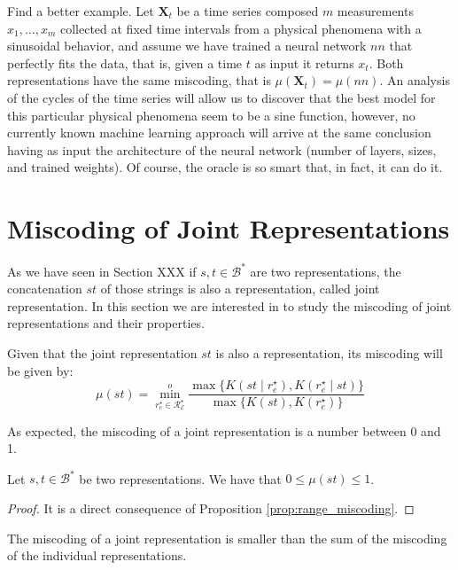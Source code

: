 \begin{example}
{\color{red} Find a better example.} Let $\mathbf{X}_t$ be a time series composed $m$ measurements $x_1, \ldots, x_m$ collected at fixed time intervals from a physical phenomena with a sinusoidal behavior, and assume we have trained a neural network $nn$ that perfectly fits the data, that is, given a time $t$ as input it returns $x_t$. Both representations have the same miscoding, that is $\mu(\mathbf{X}_t) = \mu(nn)$. An analysis of the cycles of the time series will allow us to discover that the best model for this particular physical phenomena seem to be a sine function, however, no currently known machine learning approach will arrive at the same conclusion having as input the architecture of the neural network (number of layers, sizes, and trained weights). Of course, the oracle is so smart that, in fact, it can do it.
\end{example}

%
%
\section{Miscoding of Joint Representations}
\label{sec:joint_miscoding}

As we have seen in Section {\color{red} XXX} if $s, t \in \mathcal{B}^\ast$ are two representations, the concatenation $st$ of those strings is also a representation, called joint representation. In this section we are interested in to study the miscoding of joint representations and their properties.

Given that the joint representation $st$ is also a representation, its miscoding will be given by:
\[
\mu(st) = \overset{o}{ \underset{ r^\star_e \in \mathcal{R}^\star_\mathcal{E} } \min} \frac{ \max\{ K \left( st \mid r^\star_e \right), K \left( r^\star_e \mid st \right) \} } { \max\{ K \left( st \right), K \left( r^\star_e \right) \} }
\]

As expected, the miscoding of a joint representation is a number between 0 and 1.

\begin{proposition}
Let $s, t \in \mathcal{B}^\ast$ be two representations. We have that $0 \leq \mu(st) \leq 1$.
\end{proposition}
\begin{proof}
It is a direct consequence of Proposition \ref{prop:range_miscoding}.
\end{proof}

The miscoding of a joint representation is smaller than the sum of the miscoding of the individual representations.

